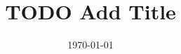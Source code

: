 \documentclass{uva-inf-article}
\title{TODO Add Title}
\date{\today}
\begin{document}
\maketitle

\newpage

\begin{multicols}{2}










\end{multicols}

\printbibliography{}
 
\end{document}
